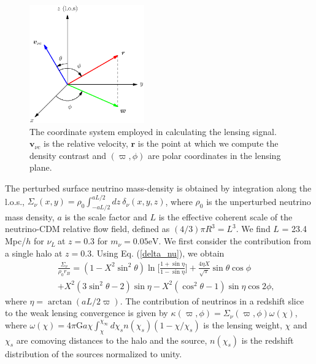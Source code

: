 \documentclass[aps,prl,twocolumn,showpacs,superscriptaddress,groupedaddress,nofootinbib]{revtex4}  %
\newcommand{\mr}{\mathrm}
\newcommand{\nul}{\ensuremath{{\nu_L~}}}
\begin{document}
\begin{figure}[tbp]
  \begin{center}
    \includegraphics[width=0.44\textwidth]{fig_2.eps}
  \end{center}
  \vspace{-0.7cm}
  \caption{ The coordinate system employed in calculating the lensing
    signal.  $\bm v_{\nu c}$ is the relative velocity, $\bm r$ is the
    point at which we compute the density contrast and $(\varpi,
    \phi)$ are polar coordinates in the lensing plane.}
  \label{fig:coords}
\end{figure}
The perturbed surface neutrino mass-density is obtained by integration along the
l.o.s., $\Sigma_\nu(x,y)=\rho_0\int^{aL/2}_{-aL/2} dz~\delta_\nu(x,y,z)$,
where $\rho_0$ is the unperturbed neutrino mass density, $a$ is the scale 
factor and $L$ is the
effective coherent scale of the neutrino-CDM relative flow field,
defined as $(4/3)\pi R^3=L^3$.  We find $L$ = 23.4 Mpc/$h$ for
\nul at $z=0.3$ for $m_\nu=0.05\mr{eV}$. 
We first consider the contribution from a single halo at $z=0.3$.
Using Eq. (\ref{delta_nu}), we obtain
\begin{eqnarray}
&&  \frac{\Sigma_\nu}{\rho_0r_B}=(1-X^2\sin^2\theta)
  \ln\bigg[\frac{1+\sin\eta}{1-\sin\eta}\bigg]+\frac{4\eta X}{\sqrt{\pi}}\sin\theta\cos\phi
   \nonumber \\
  && +X^2(3\sin^2\theta-2)\sin\eta
  -X^2(\cos^2\theta-1)\sin\eta\cos2\phi,\nonumber
\end{eqnarray}
where $\eta = \arctan(aL/2 \varpi)$.  
The contribution of neutrinos in a redshift slice to the weak lensing 
convergence is given by
$\kappa(\varpi,\phi)=\Sigma_\nu(\varpi,\phi)\omega(\chi)$, where
$\omega(\chi)={4\pi\mr{G}}a\chi\int_\chi^{\chi_\infty}
d\chi_sn(\chi_s)(1-\chi/\chi_s)$
is the lensing weight, $\chi$ and $\chi_s$ are comoving distances to the halo
and the source, $n(\chi_s)$ is the redshift distribution of the sources 
normalized to unity.
\end{document}
